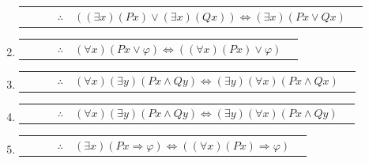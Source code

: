 \documentclass[12pt]{report}
\newcounter{it}
\theoremstyle{largebreak}
\newcounter{tablec}
\begin{document}
\begin{excer}
\begin{enumerate}[label=($\alph*$)]
\begin{center}
\begin{tabular}{l r l c l r}
                    \hline
                    & & & $\therefore$ & $((\exists x)(Px)\lor(\exists x)(Qx))\iff(\exists x)(Px\lor Qx)$ & \\
                \end{tabular}
            \end{center}
            \item \begin{center}
                \setcounter{tablec}{1}
                \begin{tabular}{l r l c l r}
                    \hline
                    & & & $\therefore$ & $(\forall x)(Px\lor\varphi)\iff((\forall x)(Px)\lor\varphi)$ & \\
                \end{tabular}
            \end{center}
            \item \begin{center}
                \setcounter{tablec}{1}
                \begin{tabular}{l r l c l r}
                    \hline
                    & & & $\therefore$ & $(\forall x)(\exists y)(Px\land Qy)\iff(\exists y)(\forall x)(Px\land Qx)$ & \\
                \end{tabular}
            \end{center}
            \item \begin{center}
                \setcounter{tablec}{1}
                \begin{tabular}{l r l c l r}
                    \hline
                    & & & $\therefore$ & $(\forall x)(\exists y)(Px\land Qy)\iff(\exists y)(\forall x)(Px\land Qy)$ & \\
                \end{tabular}
            \end{center}
            \item \begin{center}
                \setcounter{tablec}{1}
                \begin{tabular}{l r l c l r}
                    \hline
                    & & & $\therefore$ & $(\exists x)(Px\Rightarrow\varphi)\iff((\forall x)(Px)\Rightarrow\varphi)$ & \\
                \end{tabular}
            \end{center}
        \end{enumerate}
    \end{excer}
\end{document}
